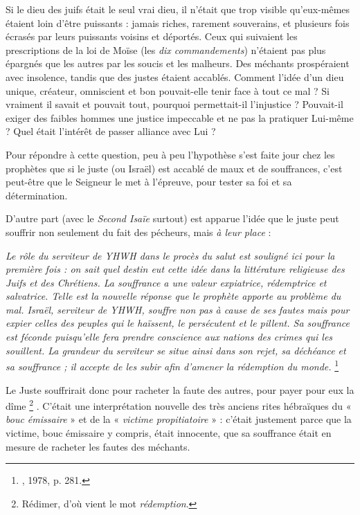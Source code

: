  Si le dieu des juifs était le seul vrai dieu, il n'était que trop visible qu'eux-mêmes étaient loin d'être puissants : jamais riches, rarement souverains, et plusieurs fois écrasés par leurs puissants voisins et déportés. Ceux qui suivaient les prescriptions de la loi de Moïse (les \emph{dix commandements}) n'étaient pas plus épargnés que les autres par les soucis et les malheurs. Des méchants prospéraient avec insolence, tandis que des justes étaient accablés. Comment l'idée d'un dieu unique, créateur, omniscient et bon pouvait-elle tenir face à tout ce mal ? Si vraiment il savait et pouvait tout, pourquoi permettait-il l'injustice ? Pouvait-il exiger des faibles hommes une justice impeccable et ne pas la pratiquer Lui-même ? Quel était l'intérêt de passer alliance avec Lui ? 

 Pour répondre à cette question, peu à peu l'hypothèse s'est faite jour chez les prophètes que si le juste (ou Israël) est accablé de maux et de souffrances, c'est peut-être que le Seigneur le met à l'épreuve, pour tester sa foi et sa détermination. 

 D'autre part (avec le \emph{Second Isaïe} surtout) est apparue l'idée que le juste peut souffrir non seulement du fait des pécheurs, mais \emph{à leur place} :

\begin{displayquote}
{\emph{Le rôle du serviteur de YHWH dans le procès du salut est souligné ici pour la première fois : on sait quel destin eut cette idée dans la littérature religieuse des Juifs et des Chrétiens. La souffrance a une valeur expiatrice, rédemptrice et salvatrice. Telle est la nouvelle réponse que le prophète apporte au problème du mal. Israël, serviteur de YHWH, souffre non pas à cause de ses fautes mais pour expier celles des peuples qui le haïssent, le persécutent et le pillent. Sa souffrance est féconde puisqu'elle fera prendre conscience aux nations des crimes qui les souillent. La grandeur du serviteur se situe ainsi dans son rejet, sa déchéance et sa souffrance ; il accepte de les subir afin d'amener la rédemption du monde.}%
\footnote{, 1978, p. 281.}%
}
\end{displayquote}

Le Juste souffrirait donc pour racheter la faute des autres, pour payer pour eux la dîme%
\footnote{Rédimer, d'où vient le mot \emph{rédemption}.}%
. C'était une interprétation nouvelle des très anciens rites hébraïques du « \emph{bouc émissaire} » et de la « \emph{victime propitiatoire} » : c'était justement parce que la victime, bouc émissaire y compris, était innocente, que sa souffrance était en mesure de racheter les fautes des méchants. 

